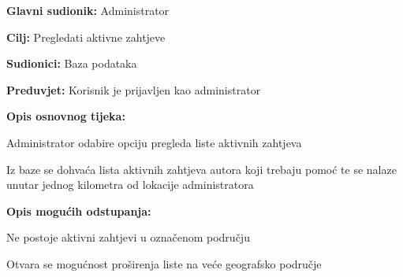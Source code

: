 \begin{packed_item}
	
	\item \textbf{Glavni sudionik: }Administrator
	\item  \textbf{Cilj:} Pregledati aktivne zahtjeve
	\item  \textbf{Sudionici:} Baza podataka
	\item  \textbf{Preduvjet:} Korisnik je prijavljen kao administrator
	\item  \textbf{Opis osnovnog tijeka:}
	
	\item[] \begin{packed_enum}
		
		\item Administrator odabire opciju pregleda liste aktivnih zahtjeva
		\item Iz baze se dohvaća lista aktivnih zahtjeva autora koji trebaju pomoć te se nalaze unutar jednog kilometra od lokacije administratora
	\end{packed_enum}
	
	\item  \textbf{Opis mogućih odstupanja:}
	
	\item[] \begin{packed_item}
		
		\item[2.a] Ne postoje aktivni zahtjevi u označenom području
		\item[] \begin{packed_enum}
			
			\item Otvara se mogućnost proširenja liste na veće geografsko područje
			
		\end{packed_enum}
	\end{packed_item}
\end{packed_item}
\noindent {}

